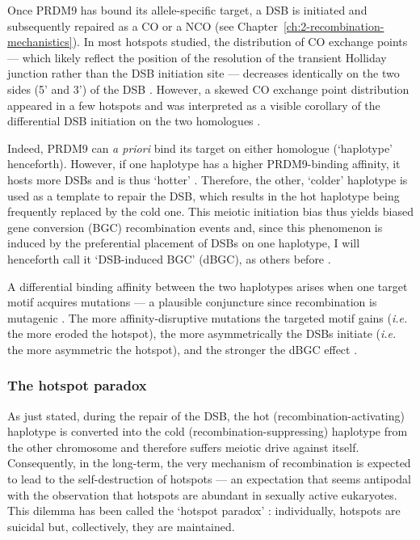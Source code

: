 Once PRDM9 has bound its allele-specific target, a DSB is initiated and subsequently repaired as a CO or a NCO (see Chapter~\ref{ch:2-recombination-mechanistics}).
In most hotspots studied, the distribution of CO exchange points — which likely reflect the position of the resolution of the transient Holliday junction rather than the DSB initiation site \citep{smith2001homologous} — decreases identically on the two sides (5’ and 3’) of the DSB \citep{arnheim2007mammalian}.
However, a skewed CO exchange point distribution appeared in a few hotspots \citep{jeffreys2002reciprocal,jeffreys2005factors,yauk2003highresolution,neumann2006polymorphism} and was interpreted as a visible corollary of the differential DSB initiation on the two homologues \citep{baudat2007cis}.

Indeed, PRDM9 can \textit{a priori} bind its target on either homologue (‘haplotype’ henceforth). 
However, if one haplotype has a higher PRDM9-binding affinity, it hosts more DSBs and is thus ‘hotter’ \citep{zelazowski2016marks}.
Therefore, the other, ‘colder’ haplotype is used as a template to repair the DSB, which results in the hot haplotype being frequently replaced by the cold one. 
This meiotic initiation bias thus yields biased gene conversion (BGC) recombination events and, since this phenomenon is induced by the preferential placement of DSBs on one haplotype, I will henceforth call it ‘DSB-induced BGC’ (dBGC), as others before \citep{lesecque2014biased, grey2018prdm9}.

A differential binding affinity between the two haplotypes arises when one target motif acquires mutations — a plausible conjuncture since recombination is mutagenic \citep{arbeithuber2015crossovers,rattray2015elevated}.
The more affinity-disruptive mutations the targeted motif gains (\textit{i.e.} the more eroded the hotspot), the more asymmetrically the DSBs initiate (\textit{i.e.} the more asymmetric the hotspot), and the stronger the dBGC effect \citep[reviewed in][]{tiemann-boege2017consequences}.



\subsubsection{The hotspot paradox}

As just stated, during the repair of the DSB, the hot (recombination-activating) haplotype is converted into the cold (recombination-suppressing) haplotype from the other chromosome \citep{gutz1971site,schuchert1988ade6m26,jeffreys2009rise} and therefore suffers meiotic drive against itself.
Consequently, in the long-term, the very mechanism of recombination is expected to lead to the self-destruction of hotspots — an expectation that seems antipodal with the observation that hotspots are abundant in sexually active eukaryotes.
This dilemma has been called the ‘hotspot paradox’ \citep{boulton1997hotspot,coop2007live,lesecque2014red}: individually, hotspots are suicidal but, collectively, they are maintained.

